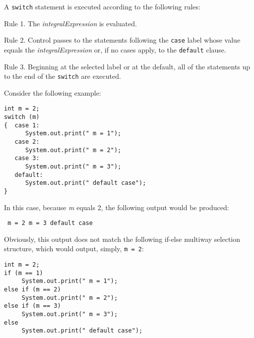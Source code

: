 A {\tt switch} statement is executed according
to the following rules:

\begin{NL}
\item[Rule 1.]  The {\it integralExpression} is evaluated.
\vspace*{6pt}
\item[Rule 2.]  Control passes to the statements following the {\tt case}
label whose value equals the {\it integralExpression} or,
if no cases apply, to the {\tt default} clause.
\vspace*{6pt}

\item[Rule 3.]  Beginning at the selected label or at the default, all
of the statements up to the end of the {\tt switch} are executed.
\end{NL}

\noindent Consider the following example:

\begin{jjjlisting}
\begin{lstlisting}
int m = 2;
switch (m)
{  case 1:
      System.out.print(" m = 1");
   case 2:
      System.out.print(" m = 2");
   case 3:
      System.out.print(" m = 3");
   default:
      System.out.print(" default case");
}
\end{lstlisting}
\end{jjjlisting}

\noindent In this case, because {\it m} equals 2, the following output
would be produced:

\begin{jjjlisting}
\begin{lstlisting}
 m = 2 m = 3 default case
\end{lstlisting}
\end{jjjlisting}

\noindent Obviously, this output does not match
the following if-else multiway selection
structure, which would output,
simply, {\tt m = 2}:


\begin{jjjlisting}
\begin{lstlisting}
int m = 2;
if (m == 1)
     System.out.print(" m = 1");
else if (m == 2)
     System.out.print(" m = 2");
else if (m == 3)
     System.out.print(" m = 3");
else
     System.out.print(" default case");
\end{lstlisting}
\end{jjjlisting}

